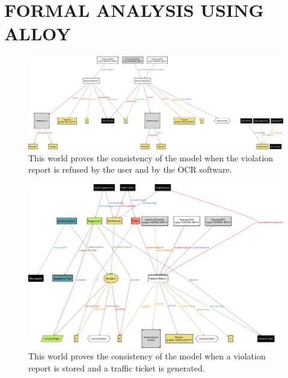 \documentclass[a4paper]{article}
\begin{document}
\newpage

\section{FORMAL ANALYSIS USING ALLOY}\label{formal_analysis_using_alloy}



\newpage



\begin{figure}[H]
\centering
\includegraphics[width=\textwidth]{alloy/world_no_confirmation}
\caption{This world proves the consistency of the model when the violation
report is refused by the user and by the OCR software.}
\end{figure}

\newpage



\begin{figure}[H]
\centering
\includegraphics[width=\textwidth]{alloy/world_tickets_and_suggestions}
\caption{This world proves the consistency of the model when a violation
report is stored and a traffic ticket is generated.}
\end{figure}
\end{document}
